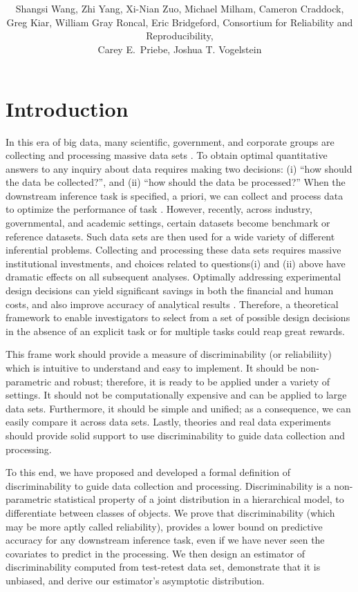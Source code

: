 \documentclass{article}
\title{\vspace{-50pt}
\db{Optimal Design for Discovery Science via Maximizing Discriminability: \\ Applications in Neuroimaging}
}
\author{Shangsi Wang, Zhi Yang, Xi-Nian Zuo, Michael Milham, Cameron Craddock,  \\ 
Greg Kiar, William Gray Roncal, Eric Bridgeford,
Consortium for Reliability and Reproducibility, \\ Carey E.~Priebe, Joshua T. Vogelstein}
\begin{document}
\maketitle
\tableofcontents
\newpage
\linenumbers

\section{Introduction}

In this era of big data, many scientific, government, and corporate groups are collecting and processing massive data sets \cite{manyika2011big,wu2014data}. To obtain optimal quantitative answers to any inquiry about data requires making two decisions: (i) “how should the data be collected?”, and (ii) “how should the data be processed?”  When the downstream inference task is specified, a priori, we can collect and process data to optimize the performance of task \cite{kohavi1995study,reiter2011mprophet}. However, recently, across industry, governmental, and academic settings, certain datasets become benchmark or reference datasets. Such data sets are then used for a wide variety of different inferential problems. Collecting and processing these data sets requires massive institutional investments, and choices related to questions(i) and (ii) above have dramatic effects on all subsequent analyses. Optimally addressing experimental design decisions can yield significant savings in both the financial and human costs, and also improve accuracy of analytical results \cite{ballou1985modeling,dale1999optimal,banga2008parameter}. Therefore, a theoretical framework to enable investigators to select from a set of possible design decisions in the absence of an explicit task or for multiple tasks could reap great rewards.

This frame work should provide a measure of discriminability (or reliabiliity) which is intuitive to understand and easy to implement. It should be non-parametric and robust; therefore, it is ready to be applied under a variety of settings. It should not be computationally expensive and can be applied to large data sets. Furthermore, it should be simple and unified; as a consequence, we can easily compare it across data sets. Lastly, theories and real data experiments should provide solid support to use discriminability to guide data collection and processing. 
 
To this end, we have proposed and developed a formal definition of discriminability to guide data collection and processing. Discriminability is a non-parametric statistical property of a joint distribution in a hierarchical model, to differentiate between classes of objects. We prove that discriminability (which may be more aptly called reliability), provides a lower bound on predictive accuracy for any downstream inference task, even if we have never seen the covariates to predict in the processing. We then design an estimator of discriminability computed from test-retest data set, demonstrate that it is unbiased, and derive our estimator’s asymptotic distribution. 
\end{document}
